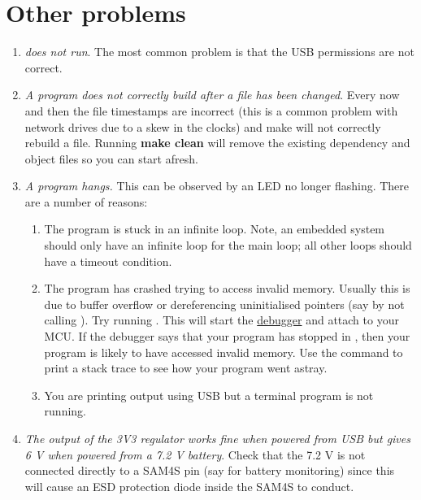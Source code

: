 \section{Other problems}
\label{faq}

\begin{enumerate}
\item
  \emph{ does not run}. The most common problem is that the
  USB permissions are not correct.
\item
  \emph{A program does not correctly build after a file has been
  changed}. Every now and then the file timestamps are incorrect (this
  is a common problem with network drives due to a skew in the clocks)
  and make will not correctly rebuild a file. Running \textbf{make
  clean} will remove the existing dependency and object files so you can
  start afresh.
\item
  \emph{A program hangs.} This can be observed by an LED no longer
  flashing. There are a number of reasons:

  \begin{enumerate}
  \item
    The program is stuck in an infinite loop. Note, an embedded system
    should only have an infinite loop for the main loop; all other loops
    should have a timeout condition.
  \item
    The program has crashed trying to access invalid memory. Usually
    this is due to buffer overflow or dereferencing uninitialised
    pointers (say by not calling ). Try running
    .  This will start the
    \protect\hyperref[debugging]{debugger} and attach to your MCU. If
    the debugger says that your program has stopped in
    , then your program is likely to have
    accessed invalid memory. Use the  command to print a
    stack trace to see how your program went astray.
  \item You are printing output using USB but a terminal program is
    not running.
  \end{enumerate}
\item
  \emph{The output of the 3V3 regulator works fine when powered from USB
  but gives 6 V when powered from a 7.2 V battery}. Check that the 7.2 V
  is not connected directly to a SAM4S pin (say for battery monitoring)
  since this will cause an ESD protection diode inside the SAM4S to
  conduct.
  
\end{enumerate}

